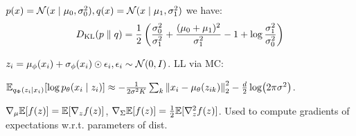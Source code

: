 \begin{definition}[Normal KL]
    \(p(x) = \operatorname{\mathcal{N}}(x \mid \mu_0, \sigma_0^2), q(x) = \operatorname{\mathcal{N}}(x \mid \mu_1, \sigma_1^2)\) we have:
    \[D_{\text{KL}}(p \parallel q) = \frac{1}{2}\left(\frac{\sigma_0^2}{\sigma_1^2} + \frac{(\mu_0 + \mu_1)^2}{\sigma_1^2} - 1 + \log\frac{\sigma_1^2}{\sigma_0^2}\right)\]
\end{definition}


\begin{definition}[Reparam.]
    \(z_i = \mu_\phi(x_i) + \sigma_\phi(x_i) \odot \epsilon_i, \epsilon_i \sim \operatorname{\mathcal{N}}(0, I)\). LL via MC:

    \(\mathbb{E}_{q_\Phi(z_i \mid x_i)}[\log p_\theta(x_i \mid z_i)] \approx -\frac{1}{2 \sigma^2 K} \sum_{k} \norm{x_i - \mu_\theta(z_{ik})}_2^2 - \frac{d}{2} \log (2\pi \sigma^2)\).
\end{definition}

\begin{theorem}
    \(\nabla_\mu \mathbb{E}[f(z)] = \mathbb{E}[\nabla_z f(z)]\), \(\nabla_\Sigma \mathbb{E}[f(z)] = \frac 1 2 \mathbb{E}[\nabla^2_z f(z)]\). Used to compute gradients of expectations w.r.t. parameters of dist.
\end{theorem}
